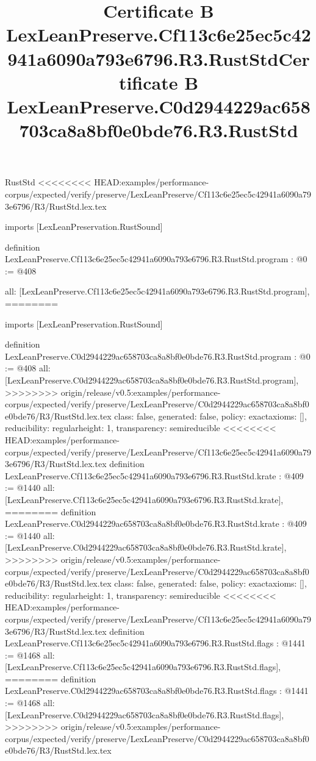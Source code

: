 \begin{lexlean}{RustStd}
<<<<<<<< HEAD:examples/performance-corpus/expected/verify/preserve/LexLeanPreserve/Cf113c6e25ec5c42941a6090a793e6796/R3/RustStd.lex.tex
\title{Certificate B LexLeanPreserve.Cf113c6e25ec5c42941a6090a793e6796.R3.RustStd}
\begin{coremodule}
imports [LexLeanPreservation.RustSound]

definition LexLeanPreserve.Cf113c6e25ec5c42941a6090a793e6796.R3.RustStd.program : @0 := @408 {
  all: [LexLeanPreserve.Cf113c6e25ec5c42941a6090a793e6796.R3.RustStd.program],
========
\title{Certificate B LexLeanPreserve.C0d2944229ac658703ca8a8bf0e0bde76.R3.RustStd}
\begin{coremodule}
imports [LexLeanPreservation.RustSound]

definition LexLeanPreserve.C0d2944229ac658703ca8a8bf0e0bde76.R3.RustStd.program : @0 := @408 {
  all: [LexLeanPreserve.C0d2944229ac658703ca8a8bf0e0bde76.R3.RustStd.program],
>>>>>>>> origin/release/v0.5:examples/performance-corpus/expected/verify/preserve/LexLeanPreserve/C0d2944229ac658703ca8a8bf0e0bde76/R3/RustStd.lex.tex
  class: false,
  generated: false,
  policy: exact{axioms: []},
  reducibility: regular{height: 1},
  transparency: semireducible
}
<<<<<<<< HEAD:examples/performance-corpus/expected/verify/preserve/LexLeanPreserve/Cf113c6e25ec5c42941a6090a793e6796/R3/RustStd.lex.tex
definition LexLeanPreserve.Cf113c6e25ec5c42941a6090a793e6796.R3.RustStd.krate : @409 := @1440 {
  all: [LexLeanPreserve.Cf113c6e25ec5c42941a6090a793e6796.R3.RustStd.krate],
========
definition LexLeanPreserve.C0d2944229ac658703ca8a8bf0e0bde76.R3.RustStd.krate : @409 := @1440 {
  all: [LexLeanPreserve.C0d2944229ac658703ca8a8bf0e0bde76.R3.RustStd.krate],
>>>>>>>> origin/release/v0.5:examples/performance-corpus/expected/verify/preserve/LexLeanPreserve/C0d2944229ac658703ca8a8bf0e0bde76/R3/RustStd.lex.tex
  class: false,
  generated: false,
  policy: exact{axioms: []},
  reducibility: regular{height: 1},
  transparency: semireducible
}
<<<<<<<< HEAD:examples/performance-corpus/expected/verify/preserve/LexLeanPreserve/Cf113c6e25ec5c42941a6090a793e6796/R3/RustStd.lex.tex
definition LexLeanPreserve.Cf113c6e25ec5c42941a6090a793e6796.R3.RustStd.flags : @1441 := @1468 {
  all: [LexLeanPreserve.Cf113c6e25ec5c42941a6090a793e6796.R3.RustStd.flags],
========
definition LexLeanPreserve.C0d2944229ac658703ca8a8bf0e0bde76.R3.RustStd.flags : @1441 := @1468 {
  all: [LexLeanPreserve.C0d2944229ac658703ca8a8bf0e0bde76.R3.RustStd.flags],
>>>>>>>> origin/release/v0.5:examples/performance-corpus/expected/verify/preserve/LexLeanPreserve/C0d2944229ac658703ca8a8bf0e0bde76/R3/RustStd.lex.tex
}}}
\end{coremodule}}
\end{coremodule}
\end{lexlean}
